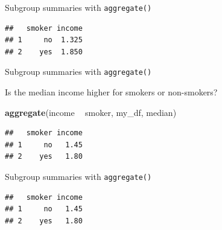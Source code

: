 \documentclass[ignorenonframetext,]{beamer}
\newenvironment{Shaded}{\begin{snugshade}}{\end{snugshade}}
\newcommand{\DataTypeTok}[1]{\textcolor[rgb]{0.13,0.29,0.53}{#1}}
\newcommand{\KeywordTok}[1]{\textcolor[rgb]{0.13,0.29,0.53}{\textbf{#1}}}
\newcommand{\NormalTok}[1]{#1}
\newcommand{\OperatorTok}[1]{\textcolor[rgb]{0.81,0.36,0.00}{\textbf{#1}}}
\newcommand{\StringTok}[1]{\textcolor[rgb]{0.31,0.60,0.02}{#1}}
\begin{document}
\begin{frame}[fragile]{Subgroup summaries with \texttt{aggregate()}}
\protect\hypertarget{subgroup-summaries-with-aggregate-6}{}

\begin{Shaded}
\end{Shaded}

\begin{verbatim}
##   smoker income
## 1     no  1.325
## 2    yes  1.850
\end{verbatim}

\end{frame}

\begin{frame}[fragile]{Subgroup summaries with \texttt{aggregate()}}
\protect\hypertarget{subgroup-summaries-with-aggregate-7}{}

Is the median income higher for smokers or non-smokers?

\begin{Shaded}
\begin{Highlighting}[]
\KeywordTok{aggregate}\NormalTok{(income }\OperatorTok{~}\StringTok{ }\NormalTok{smoker, my_df, median)}
\end{Highlighting}
\end{Shaded}

\begin{verbatim}
##   smoker income
## 1     no   1.45
## 2    yes   1.80
\end{verbatim}

\end{frame}

\begin{frame}[fragile]{Subgroup summaries with \texttt{aggregate()}}
\protect\hypertarget{subgroup-summaries-with-aggregate-8}{}

\begin{Shaded}
\end{Shaded}

\begin{verbatim}
##   smoker income
## 1     no   1.45
## 2    yes   1.80
\end{verbatim}

\end{frame}
\end{document}
